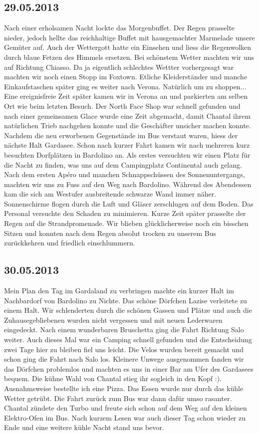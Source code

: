 \subsection{29.05.2013}
Nach einer erholsamen Nacht lockte das Morgenbuffet.
Der Regen prasselte nieder, jedoch hellte das reichhaltige Buffet mit hausgemachter Marmelade unsere Gemüter auf.
Auch der Wettergott hatte ein Einsehen und liess die Regenwolken durch blaue Fetzen des Himmels ersetzen.
Bei schönstem Wetter machten wir uns auf Richtung Chiasso.
Da ja eigentlich schlechtes Wettter vorhergesagt war machten wir noch einen Stopp im Foxtown.
Etliche Kleiderständer und manche Einkaufstaschen später ging es weiter nach Verona.
Natürlich um zu shoppen...
Eine ereignisfreie Zeit später kamen wir in Verona an und parkierten am selben Ort wie beim letzten Besuch.
Der North Face Shop war schnell gefunden und nach einer gemeinsamen Glace wurde eine Zeit abgemacht, damit Chantal ihrem natürlichen Trieb nachgehen konnte und die Geschäfter unsicher machen konnte.
Nachdem die neu erworbenen Gegenstände im Bus verstaut waren, hiess der nächste Halt Gardasee.
Schon nach kurzer Fahrt kamen wir nach mehreren kurz besuchten Dorfplätzen in Bardolino an.
Als erstes versuchten wir einen Platz für die Nacht zu finden, was uns auf dem Campingplatz Continental auch gelang.
Nach dem ersten Apéro und manchen Schnappschüssen des Sonnenuntergangs, machten wir uns zu Fuss auf den Weg nach Bardolino.
Während des Abendessen kam die sich am Westufer ausbreitende schwarze Wand immer näher.
Sonnenschirme flogen durch die Luft und Gläser zerschlugen auf dem Boden.
Das Personal versuchte den Schaden zu minimieren.
Kurze Zeit  später prasselte der Regen auf die Strandpromenade.
Wir blieben glücklicherweise noch ein bisschen Sitzen und konnten nach dem Regen absolut trocken zu unserem Bus zurückkehren und friedlich einschlummern.  
\subsection{30.05.2013}
Mein Plan den Tag im Gardaland zu verbringen machte ein kurzer Halt im Nachbardorf von Bardolino zu Nichte.
Das schöne Dörfchen Lazise verleitete zu einem Halt.
Wir schlenderten durch die schönen Gassen und Plätze und auch die Zuhausegebliebenen wurden nicht vergessen und mit neuen Lederwaren eingedeckt.
Nach einem wunderbaren Bruschetta ging die Fahrt Richtung Salo weiter.
Auch dieses Mal war ein Camping schnell gefunden und die Entscheidung zwei Tage hier zu bleiben fiel uns leicht.
Die Velos wurden bereit gemacht und schon ging die Fahrt nach Salo los.
Kleinere Unwege ausgenommen fanden wir das Dörfchen problemlos und machten es uns in einer Bar am Ufer des Gardasees bequem.
Die kühne Wahl von Chantal stieg ihr sogleich in den Kopf :).
Ausnahmsweise bestellte ich eine Pizza.
Das Essen wurde nur durch das kühle Wetter getrübt.
Die Fahrt zurück zum Bus war dann  dafür umso rasanter.
Chantal zündete den Turbo und freute sich schon auf dem Weg auf den kleinen Elektro-Ofen im Bus.
Nach kurzem Lesen war auch dieser Tag schon wieder zu Ende und eine weitere kühle Nacht stand uns bevor.


